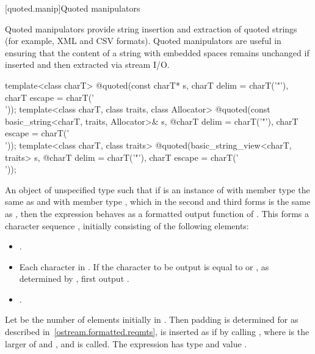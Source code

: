 [quoted.manip]{Quoted manipulators}

\pnum
\begin{note}
Quoted manipulators provide string insertion and extraction of quoted strings (for example, XML and CSV formats). Quoted manipulators are useful in ensuring that the content of a string with embedded spaces remains unchanged if inserted and then extracted via stream I/O.
\end{note}

%
\begin{itemdecl}
template<class charT>
  @\unspec@ quoted(const charT* s, charT delim = charT('"'), charT escape = charT('\\'));
template<class charT, class traits, class Allocator>
  @\unspec@ quoted(const basic_string<charT, traits, Allocator>& s,
  @\itcorr@                   charT delim = charT('"'), charT escape = charT('\\'));
template<class charT, class traits>
  @\unspec@ quoted(basic_string_view<charT, traits> s,
  @\itcorr@                   charT delim = charT('"'), charT escape = charT('\\'));
\end{itemdecl}

\begin{itemdescr}
\pnum
\returns
An object of unspecified type such that if  is an instance
of  with member type  the same as
 and with member type , which in the second and third
forms is the same as , then the expression
behaves as a formatted output function
of . This forms a character sequence , initially
consisting of the following elements:
\begin{itemize}
\item {}.
\item Each character in . If the character to be output is equal to
 or , as determined by , first
output .
\item {}.
\end{itemize}
Let  be the number of elements initially in .
Then padding is determined for  as described
in~\ref{ostream.formatted.reqmts},  is inserted as if by calling
, where  is the larger of
 and , and  is called.
The expression  has type
 and value .
\end{itemdescr}

